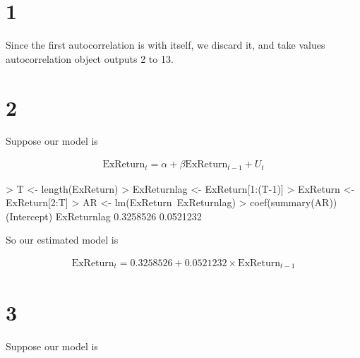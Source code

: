 \documentclass{article}
\begin{document}



\doublespacing
\section*{1}
\label{sec:1.1}


\begin{singlespace}
\end{singlespace}

Since the first autocorrelation is with itself, we discard it, and take values autocorrelation object outputs 2 to 13.

\section*{2}

Suppose our model is 
\begin{singlespace}
\begin{align*}
\text{ExReturn}_{t} = \alpha + \beta \text{ExReturn}_{t-1} + U_{t}
\end{align*}

	\begin{spverbatim}
		> T <- length(ExReturn)
		> ExReturnlag <- ExReturn[1:(T-1)]
		> ExReturn <- ExReturn[2:T]
		> AR <- lm(ExReturn~ExReturnlag)
		> coef(summary(AR))
		(Intercept) ExReturnlag 
		0.3258526   0.0521232 
	\end{spverbatim}
\end{singlespace}

So our estimated model is
\begin{singlespace}
\begin{align*}
\text{ExReturn}_{t} = 0.3258526 + 0.0521232\times \text{ExReturn}_{t-1}
\end{align*}
\end{singlespace}
\section*{3}
Suppose our model is 
\end{document}
